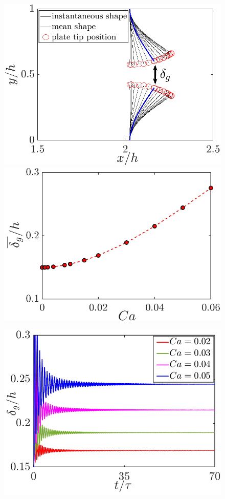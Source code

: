 \documentclass[final,3p,times,authoryear]{elsarticle}
\begin{document}
	\begin{figure}[h]
	\begin{center}
		\begin{minipage}[c]{0.49\linewidth}	
			\includegraphics[width=1\linewidth]{Figures/def_shape2.png}\\
			\includegraphics[width=1\linewidth]{Figures/gap_signal/gap_steady2.png}
		\end{minipage}
		\begin{minipage}[c]{0.49\linewidth}	
			\includegraphics[width=1\linewidth]{Figures/gap_signal/gap_sig_3_4p1_5_5p1S-2.png}

\end{minipage}
\end{center}
\end{figure}
\end{document}
